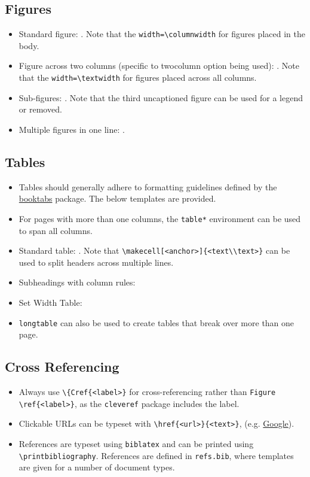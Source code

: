\subsection{Figures}
\begin{itemize}
    \item Standard figure: . Note that the \verb|width=\columnwidth| for figures placed in the body.
    
    \item Figure across two columns (specific to twocolumn option being used): . Note that the \verb|width=\textwidth| for figures placed across all columns.
    
    \item Sub-figures: . Note that the third uncaptioned figure can be used for a legend or removed.
    
    \item Multiple figures in one line: .
    
\end{itemize}
% 
\subsection{Tables}
\begin{itemize}
    \item Tables should generally adhere to formatting guidelines defined by the \href{https://ctan.org/pkg/booktabs?lang=en}{booktabs} package. The below templates are provided.
    \item For pages with more than one columns, the \verb|table*| environment can be used to span all columns.
    \item Standard table: . Note that \verb|\makecell[<anchor>]{<text\\text>}| can be used to split headers across multiple lines.
    
    \item Subheadings with column rules: 
    
    \item Set Width Table: 
    
    \item \verb|longtable| can also be used to create tables that break over more than one page.
\end{itemize}
% 
\subsection{Cross Referencing} 
\begin{itemize}
    \item Always use \verb|\{Cref{<label>}| for cross-referencing rather than \verb|Figure \ref{<label>}|, as the \verb|cleveref| package includes the label.
    \item Clickable URLs can be typeset with \verb|\href{<url>}{<text>}|, (e.g. \href{www.google.com}{Google}).
    \item References are typeset using \verb|biblatex| and can be printed using \verb|\printbibliography|. References are defined in \verb|refs.bib|, where templates are given for a number of document types.
\end{itemize}
% 
